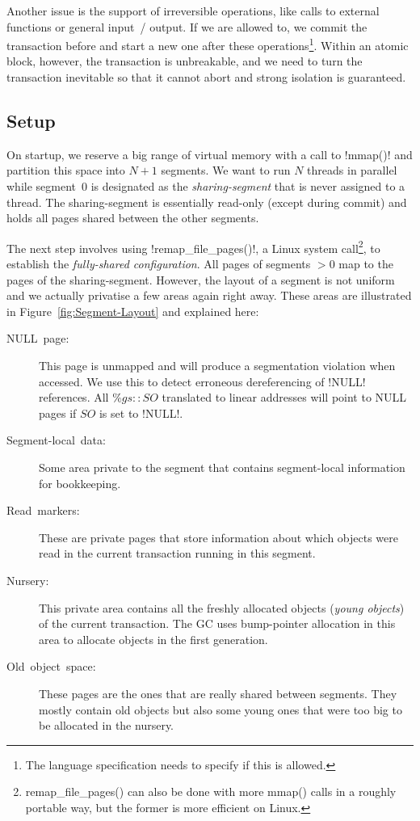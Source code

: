 \documentclass{sigplanconf}
\makeatletter
\renewcommand\lstinline[1][]{%
  \Collectverb{\@@myverb}%
}
\def\@@myverb#1{%
    \begingroup
    \fboxsep=0.2em
    \colorbox{verylightgray}{\oldlstinline|#1|}%
    \endgroup
}
\makeatother
\begin{document}
Another issue is the support of
irreversible operations, like calls to external functions or general
input~/ output. If we are allowed to, we commit the transaction
before and start a new one after these operations\footnote{The language
specification needs to specify if this is allowed.}. Within an atomic
block, however, the transaction is unbreakable, and we need to turn
the transaction inevitable so that it
cannot abort and strong isolation is guaranteed.



\subsection{Setup\label{sub:Setup}}

On startup, we reserve a big range of virtual memory with a call to
\lstinline!mmap()! and partition this space into $N+1$ segments.
We want to run $N$ threads in parallel while segment~0 is designated as
the \emph{sharing-segment} that is never assigned to a thread. The
sharing-segment is essentially read-only (except during commit) and
holds all pages shared between the other segments.

The next step involves using \lstinline!remap_file_pages()!, a Linux
system call\footnote{remap\_file\_pages() can also be done with more mmap()
calls in a roughly portable way, but the former is more efficient on Linux.},
to establish the \emph{fully-shared configuration}.  All pages
of segments $>0$ map to the pages of the sharing-segment.
However, the layout of a segment is not uniform and we actually
privatise a few areas again right away. These areas are illustrated in
Figure~\ref{fig:Segment-Layout} and explained here:

\begin{description}
\item [{NULL~page:}] This page is unmapped and will produce a
  segmentation violation when accessed. We use this to detect
  erroneous dereferencing of \lstinline!NULL! references.  All
  $\%gs{::}SO$ translated to linear addresses will point to NULL pages
  if $SO$ is set to \lstinline!NULL!.
\item [{Segment-local~data:}] Some area private to the segment that
  contains segment-local information for bookkeeping.
\item [{Read~markers:}] These are private pages that store information about
  which objects were read in the current transaction running in this
  segment.
\item [{Nursery:}] This private area contains all the freshly allocated
  objects (\emph{young objects}) of the current transaction. The GC
  uses bump-pointer allocation in this area to allocate objects in the
  first generation.
\item [{Old~object~space:}] These pages are the ones that are really
  shared between segments. They mostly contain old objects but also
  some young ones that were too big to be allocated in the nursery.
\end{description}
\end{document}
